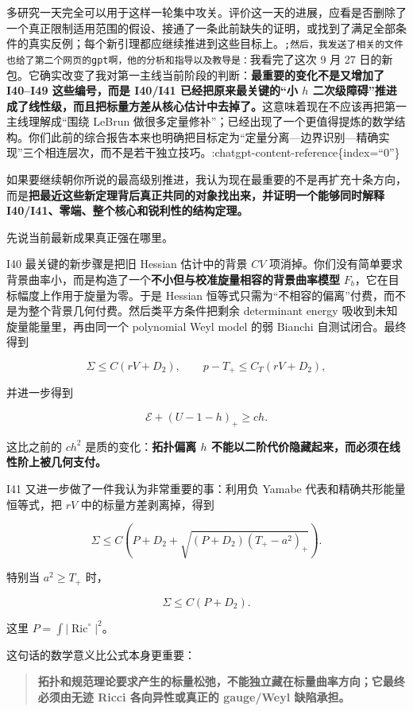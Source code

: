 \documentclass[
  10pt,
]{article}
\providecommand{\Ric}{\operatorname{Ric}}
\begin{document}
多研究一天完全可以用于这样一轮集中攻关。评价这一天的进展，应看是否删除了一个真正限制适用范围的假设、接通了一条此前缺失的证明，或找到了满足全部条件的真实反例；每个新引理都应继续推进到这些目标上。\texttt{;然后，我发送了相关的文件也给了第二个网页的gpt啊，他的分析和指导以及教导是：}我看完了这次
9 月 27
日的新包。它确实改变了我对第一主线当前阶段的判断：\textbf{最重要的变化不是又增加了
I40--I49 这些编号，而是 I40/I41 已经把原来最关键的``小 \(h\)
二次级障碍''推进成了线性级，而且把标量方差从核心估计中去掉了。}这意味着现在不应该再把第一主线理解成``围绕
LeBrun
做很多定量修补''；已经出现了一个更值得提炼的数学结构。你们此前的综合报告本来也明确把目标定为``定量分离---边界识别---精确实现''三个相连层次，而不是若干独立技巧。:chatgpt-content-reference\{index=``0''\}

如果要继续朝你所说的最高级别推进，我认为现在最重要的不是再扩充十条方向，而是\textbf{把最近这些新定理背后真正共同的对象找出来，并证明一个能够同时解释
I40/I41、零端、整个核心和锐利性的结构定理。}

先说当前最新成果真正强在哪里。

I40 最关键的新步骤是把旧 Hessian 估计中的背景 \(CV\)
项消掉。你们没有简单要求背景曲率小，而是构造了一个\textbf{不小但与校准旋量相容的背景曲率模型}
\(F_b\)，它在目标幅度上作用于旋量为零。于是 Hessian
恒等式只需为``不相容的偏离''付费，而不是为整个背景几何付费。然后类平方条件把剩余
determinant energy 吸收到未知旋量能量里，再由同一个 polynomial Weyl
model 的弱 Bianchi 自测试闭合。最终得到

\[
\Sigma\le C(rV+D_2),\qquad
p-T_+\le C_T(rV+D_2),
\]

并进一步得到

\[
\boxed{\mathcal E +(U-1-h)_+\ge c h.}
\]

这比之前的 \(ch^2\) 是质的变化：\textbf{拓扑偏离 \(h\)
不能以二阶代价隐藏起来，而必须在线性阶上被几何支付。}

I41 又进一步做了一件我认为非常重要的事：利用负 Yamabe
代表和精确共形能量恒等式，把 \(rV\) 中的标量方差剥离掉，得到

\[
\boxed{
\Sigma\le
C\left(P+D_2+\sqrt{(P+D_2)(T_+-a^2)_+}\right).
}
\]

特别当 \(a^2\ge T_+\) 时，

\[
\boxed{\Sigma\le C(P+D_2).}
\]

这里 \(P=\int|\Ric^\circ|^2\)。

这句话的数学意义比公式本身更重要：

\begin{quote}
\textbf{拓扑和规范理论要求产生的标量松弛，不能独立藏在标量曲率方向；它最终必须由无迹
Ricci 各向异性或真正的 gauge/Weyl 缺陷承担。}
\end{quote}
\end{document}
